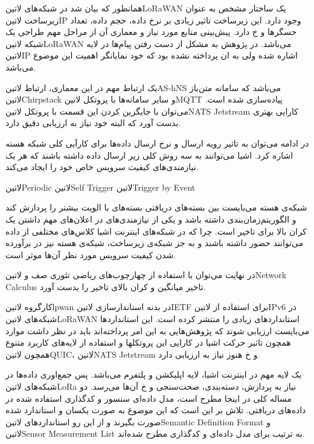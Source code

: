 همانطور که بیان شد در شبکه‌های ‌لاتین{LoRaWAN} یک ساختار مشخص به عنوان زیرساخت ‌لاتین{IP} وجود دارد.
این زیرساخت تاثیر زیادی بر نرخ داده، حجم داده، تعداد حسگرها و ‌خ دارد. پیش‌بینی منابع مورد نیاز و معماری آن از مراحل مهم طراحی یک شبکه ‌لاتین{LoRaWAN} می‌باشد.
در پژوهش  به مشکل از دست رفتن پیام‌ها در لایه ‌لاتین{IP} اشاره شده ولی به ان پرداخته نشده بود که خود نمایانگر اهمیت این موضوع می‌باشد.

یک ارتباط مهم در این معماری، ارتباط ‌لاتین{AS-hNS} می‌باشد که سامانه متن‌باز ‌لاتین{Chirpstack} و سایر سامانه‌ها با پروتکل ‌لاتین{MQTT} پیاده‌سازی شده است.
می‌توان با جایگزین کردن این قسمت با پروتکل ‌لاتین{NATS Jetstream} کارایی بهتری بدست آورد که البته خود نیاز به ارزیابی دقیق دارد.

در ادامه می‌توان به تاثیر رویه ارسال و نرخ ارسال داده‌ها برای کارآیی کلی شبکه هسته اشاره کرد.
اشیا می‌توانند به سه روش کلی زیر ارسال داده داشته باشند که هر یک نیازمندی‌های کیفیت سرویس خاص خود را ایجاد می‌کند.

 ‌لاتین{Periodic}
 ‌لاتین{Self Trigger}
 ‌لاتین{Trigger by Event}

شبکه‌ی هسته می‌بایست بین بسته‌های دریافتی بسته‌های با الویت بیشتر را پردازش کند و الگوریتم‌زمان‌بندی داشته باشد و یکی از نیازمندی‌های در اعلان‌های مهم داشتن یک کران بالا برای تاخیر است.
چرا که در شبکه‌های اینترنت اشیا کلاس‌های مختلفی از داده می‌توانند حضور داشته باشند و به جز شبکه‌ی زیرساخت، شبکه‌ی هسته نیز در برآورده شدن کیفیت سرویس مورد نظر آن‌ها موثر است.

در نهایت می‌توان با استفاده از چهارچوب‌های ریاضی تئوری صف و ‌لاتین{Network Calculus} تاخیر میانگین و کران بالای تاخیر را بدست آورد.


کارگروه ‌لاتین{lpwan} در بدنه استاندارسازی ‌لاتین{IETF} برای استفاده از ‌لاتین{IPv6} در شبکه‌های ‌لاتین{LoRaWAN} استانداردهای زیادی را منتشر کرده است.
این استانداردها می‌بایست ارزیابی شوند که پژوهش‌هایی به این امر پرداخته‌اند باید در نظر داشت موارد همچون تاثیر حرکت اشیا در کارایی این پروتکلها و استفاده از لایه‌های کاربرد متنوع همچون ‌لاتین{QUIC}، ‌لاتین{NATS Jetstream} و ‌خ هنوز نیاز به ارزیابی دارد.


یک لایه مهم در اینترنت اشیا، لایه اپلیکشن و پلتفرم می‌باشد. پس جمع‌اوری داده‌ها در شبکه‌های ‌لاتین{LoRa} نیاز به پردازش، دسته‌بندی، صحت‌سنجی و ‌خ
آن‌ها می‌رسد. دو مساله کلی در اینجا مطرح است، مدل داده‌ای سنسور و کدگذاری استفاده شده در داده‌های دریافتی. تلاش بر این است که این موضوع به صورت
یکسان و استاندارد شده صورت بگیرند و از این رو استانداردهای ‌لاتین{Semantic Definition Format} و ‌لاتین{Sensor Measurement List} به ترتیب برای مدل داده‌ای و کدگذاری مطرح شده‌اند.


